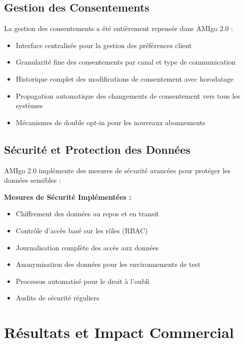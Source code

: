 \subsection{Gestion des Consentements}

La gestion des consentements a été entièrement repensée dans AMIgo 2.0 :

\begin{itemize}
    \item Interface centralisée pour la gestion des préférences client
    \item Granularité fine des consentements par canal et type de communication
    \item Historique complet des modifications de consentement avec horodatage
    \item Propagation automatique des changements de consentement vers tous les systèmes
    \item Mécanismes de double opt-in pour les nouveaux abonnements
\end{itemize}

\subsection{Sécurité et Protection des Données}

AMIgo 2.0 implémente des mesures de sécurité avancées pour protéger les données sensibles :

\begin{mdframed}[backgroundcolor=warningorange, linewidth=0pt, innerleftmargin=10pt, innerrightmargin=10pt]
\textbf{Mesures de Sécurité Implémentées :}
\begin{itemize}
    \item Chiffrement des données au repos et en transit
    \item Contrôle d'accès basé sur les rôles (RBAC)
    \item Journalisation complète des accès aux données
    \item Anonymisation des données pour les environnements de test
    \item Processus automatisé pour le droit à l'oubli
    \item Audits de sécurité réguliers
\end{itemize}
\end{mdframed}

\section{Résultats et Impact Commercial}

